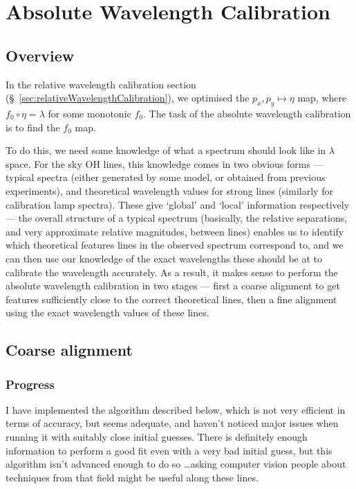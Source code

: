\section{Absolute Wavelength Calibration}
\label{sec:absoluteWavelengthCalibration}

\subsection{Overview}

In the relative wavelength calibration section
(\S~\ref{sec:relativeWavelengthCalibration}), we optimised the $p_x, p_y
\mapsto \eta$ map, where $f_0 \circ \eta = \lambda$ for some monotonic
$f_0$. The task of the absolute wavelength calibration is to find the
$f_0$ map.

To do this, we need some knowledge of what a spectrum should look like
in $\lambda$ space. For the sky OH lines, this knowledge comes in two obvious
forms --- typical spectra (either generated by some model, or obtained
from previous experiments), and theoretical wavelength values for
strong lines (similarly for calibration lamp spectra). These give
`global' and `local' information respectively --- the overall structure
of a typical spectrum (basically, the relative separations, and very
approximate relative magnitudes, between lines) enables us to identify
which theoretical features lines in the observed spectrum correspond
to, and we can then use our knowledge of the exact wavelengths these
should be at to calibrate the wavelength accurately. As a result, it
makes sense to perform the absolute wavelength calibration in two
stages --- first a coarse alignment to get features sufficiently close
to the correct theoretical lines, then a fine alignment using the exact
wavelength values of these lines.


\subsection{Coarse alignment}


\subsubsection{Progress}

I have implemented the algorithm described below, which is not very
efficient in terms of accuracy, but seems adequate, and haven't noticed
major issues when running it with suitably close initial guesses. There
is definitely enough information to perform a good fit even with a very
bad initial guess, but this algorithm isn't advanced enough to do so
\dots asking computer vision people about techniques from that field
might be useful along these lines.

